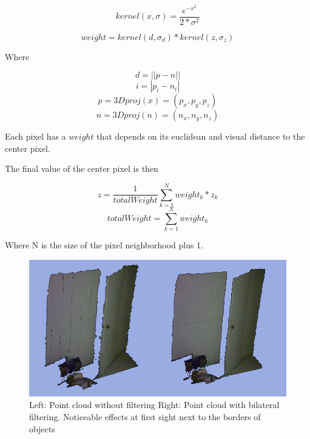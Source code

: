 $$ kernel(x,\sigma) = \frac{e^{-x^2}}{2*\sigma^2} $$

$$ weight = kernel(d,\sigma_d)*kernel(z,\sigma_z) $$

Where 

$$ d = ||p - n|| $$
$$ i = |p_i - n_i| $$
$$ p = 3Dproj(x) = (p_x,p_y,p_z) $$ 
$$ n = 3Dproj(n) = (n_x,n_y,n_z) $$

Each pixel has a $weight$ that depends on its euclidean and visual distance to the center pixel.

The final value of the center pixel is then

$$z = \frac{1}{totalWeight}\sum\limits_{k=1}^N {weight_k*z_k}$$
$$totalWeight = \sum\limits_{k=1}^N {weight_k}$$

Where N is the size of the pixel neighborhood plus 1.  

\begin{figure}[h!]
\begin{center}
\includegraphics[scale=0.25]{images/bilateral}
\end{center}
\caption{Left: Point cloud without filtering Right: Point cloud with bilateral filtering. Noticeable effects at first sight next to the borders of objects}
\end{figure}

